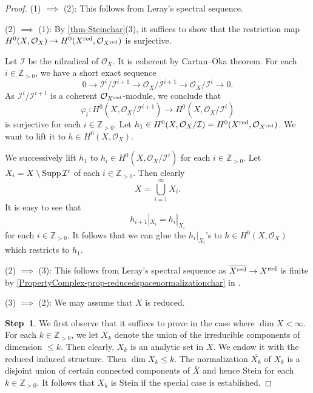 \begin{proof}
    (1) $\implies$ (2): This follows from Leray's spectral sequence.

    (2) $\implies$ (1): By \cref{thm-Steinchar}(3), it suffices to show that the restriction map $H^0(X,\mathcal{O}_X)\rightarrow H^0(X^{\operatorname{red}},\mathcal{O}_{X^{\operatorname{red}}})$ is surjective.

    Let $\mathcal{I}$ be the nilradical of $\mathcal{O}_X$. It is coherent by Cartan--Oka theorem.  For each $i\in \mathbb{Z}_{>0}$, we have a short exact sequence
    \[
        0\rightarrow \mathcal{I}^i/\mathcal{I}^{i+1}\rightarrow \mathcal{O}_X/\mathcal{I}^{i+1}\rightarrow \mathcal{O}_X/\mathcal{I}^{i}\rightarrow 0.
    \]
    As $\mathcal{I}^i/\mathcal{I}^{i+1}$ is a coherent $\mathcal{O}_{X^{\operatorname{red}}}$-module, we conclude that 
    \[
        \varphi_i: H^0(X,\mathcal{O}_X/\mathcal{I}^{i+1})\rightarrow H^0(X,\mathcal{O}_X/\mathcal{I}^{i})  
    \]
    is surjective for each  $i\in \mathbb{Z}_{>0}$. Let $h_1\in H^0(X,\mathcal{O}_X/\mathcal{I})=H^0(X^{\operatorname{red}},\mathcal{O}_{X^{\operatorname{red}}})$. We want to lift it to $h\in H^0(X,\mathcal{O}_X)$.

    We successively lift $h_1$ to $h_i\in H^0(X,\mathcal{O}_X/\mathcal{I}^i)$ for each $i\in \mathbb{Z}_{>0}$. Let $X_i=X\setminus \operatorname{Supp} \mathcal{I}^i$ of each $i\in \mathbb{Z}_{>0}$. Then clearly
    \[
        X=\bigcup_{i=1}^{\infty}X_i.  
    \] 
    It is easy to see that 
    \[
        h_{i+1}|_{X_i}=h_i|_{X_i}  
    \]
    for each $i\in \mathbb{Z}_{>0}$. It follows that we can glue the $h_i|_{X_i}$'s
    to $h\in H^0(X,\mathcal{O}_X)$ which restricts to $h_1$.

    (2) $\implies$ (3): This follows from Leray's spectral sequence as $\overline{X^{\operatorname{red}}}\rightarrow X^{\operatorname{red}}$ is finite by \cref{PropertyComplex-prop-reducedspacenormalizationchar} in .

    (3) $\implies$ (2): We may assume that $X$ is reduced. 
    
    \textbf{Step~1}.
    We first observe that it suffices to prove in the case where $\dim X<\infty$.
    For each $k\in \mathbb{Z}_{>0}$, we let $X_k$ denote the union of the irreducible components of dimension $\leq k$. Then clearly, $X_k$ is an analytic set in $X$. We endow it with the reduced induced structure. Then $\dim X_k\leq k$.
    The normalization $\overline{X_k}$ of $X_k$ is a disjoint union of certain connected components of $\bar{X}$ and hence Stein for each $k\in \mathbb{Z}_{>0}$. It follows that $X_k$ is Stein if the special case is established.


\end{proof}
